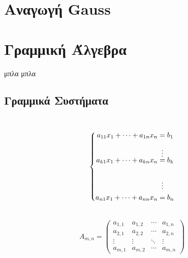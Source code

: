 \section{Αναγωγή \lt Gauss}
\section{Γραμμική Άλγεβρα}
μπλα μπλα
\subsection{Γραμμικά Συστήματα}

\ \\
\[\left\{
\begin{aligned}
   a_{11}x_{1}+\dots +a_{1n}x_n &= b_1 \\\\
   &\shortvdotswithin{=}
   a_{k1}x_{1}+\dots +a_{kn}x_n &= b_k \\ \\
   &\vdotswithin{=} \notag \\
  a_{n1}x_{1}+\dots +a_{nn}x_n &= b_n \\
\end{aligned}
\right .\]

\ \\$$
A_{m,n} = 
 \begin{pmatrix}
  a_{1,1} & a_{1,2} & \cdots & a_{1,n} \\
  a_{2,1} & a_{2,2} & \cdots & a_{2,n} \\
  \vdots  & \vdots  & \ddots & \vdots  \\
  a_{m,1} & a_{m,2} & \cdots & a_{m,n} 
 \end{pmatrix}
 $$
